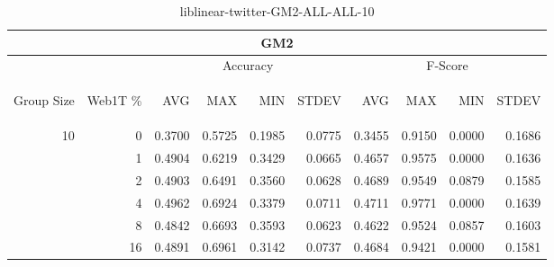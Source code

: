 \begin{center}
\begin{table}[htbp]
\begin{tabular}{ | r | r | r | r | r | r | r | r | r | r |}
\hline
\multicolumn{10}{|c|}{GM2}\\
\hline
 & & \multicolumn{4}{|c|}{Accuracy} & \multicolumn{4}{|c|}{F-Score}\\ \cline{3-10}
\begin{sideways}Group Size\end{sideways} & \begin{sideways}Web1T \%\end{sideways} & \begin{sideways}AVG\end{sideways} & \begin{sideways}MAX\end{sideways} & \begin{sideways}MIN\end{sideways} & \begin{sideways}STDEV\end{sideways} & \begin{sideways}AVG\end{sideways} & \begin{sideways}MAX\end{sideways} & \begin{sideways}MIN\end{sideways} & \begin{sideways}STDEV\end{sideways}\\
\hline
\multirow{5}{*}{10}
 & 0 & 0.3700 & 0.5725 & 0.1985 & 0.0775 & 0.3455 & 0.9150 & 0.0000 & 0.1686\\ \cline{2-10}
 & 1 & 0.4904 & 0.6219 & 0.3429 & 0.0665 & 0.4657 & 0.9575 & 0.0000 & 0.1636\\ \cline{2-10}
 & 2 & 0.4903 & 0.6491 & 0.3560 & 0.0628 & 0.4689 & 0.9549 & 0.0879 & 0.1585\\ \cline{2-10}
 & 4 & 0.4962 & 0.6924 & 0.3379 & 0.0711 & 0.4711 & 0.9771 & 0.0000 & 0.1639\\ \cline{2-10}
 & 8 & 0.4842 & 0.6693 & 0.3593 & 0.0623 & 0.4622 & 0.9524 & 0.0857 & 0.1603\\ \cline{2-10}
 & 16 & 0.4891 & 0.6961 & 0.3142 & 0.0737 & 0.4684 & 0.9421 & 0.0000 & 0.1581\\ \cline{2-10}
\hline
\end{tabular}
\caption{liblinear-twitter-GM2-ALL-ALL-10}
\label{table:liblinear-twitter-GM2-ALL-ALL-10}
\end{table}
\end{center}

